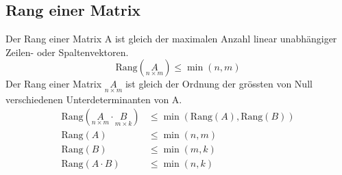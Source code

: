 \subsection{Rang einer Matrix}
Der Rang einer Matrix A ist gleich der maximalen Anzahl linear unabh\"angiger Zeilen-
oder Spaltenvektoren.
\begin{equation}
  \text{Rang}\left({\underset{n\times m}{A}}\right)\leq\min{(n,m)}
\end{equation}
Der Rang einer Matrix $\underset{n\times m}{A}$ ist gleich der Ordnung
der gr\"ossten von Null verschiedenen Unterdeterminanten von A.
\begin{align}
  \text{Rang}\left({\underset{n\times m}{A}\cdot\underset{m\times k}{B}}\right)
	&\leq\min{\left({\text{Rang}(A), \text{Rang}(B)}\right)} \\
  \text{Rang}\left({A}\right) & \leq\min{(n, m)} \\
  \text{Rang}\left({B}\right) & \leq\min{(m, k)} \\
  \text{Rang}\left({A\cdot B}\right) & \leq\min{(n, k)}
\end{align}


